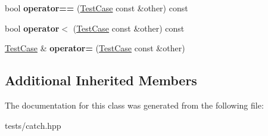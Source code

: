 \begin{DoxyCompactItemize}
\mbox{\label{class_catch_1_1_test_case_a5456d03a90f75292835c158f3a3374a1}} 
bool {\bfseries operator==} (\hyperlink{class_catch_1_1_test_case}{Test\+Case} const \&other) const
\item 
\mbox{\label{class_catch_1_1_test_case_a030e4b9282e9b32e08c8bd5e5cd6fa98}} 
bool {\bfseries operator$<$} (\hyperlink{class_catch_1_1_test_case}{Test\+Case} const \&other) const
\item 
\mbox{\label{class_catch_1_1_test_case_a8022e3f74232f7887d2d2cbbc8876502}} 
\hyperlink{class_catch_1_1_test_case}{Test\+Case} \& {\bfseries operator=} (\hyperlink{class_catch_1_1_test_case}{Test\+Case} const \&other)
\end{DoxyCompactItemize}
\subsection*{Additional Inherited Members}


The documentation for this class was generated from the following file\+:\begin{DoxyCompactItemize}
\item 
tests/catch.\+hpp\end{DoxyCompactItemize}
